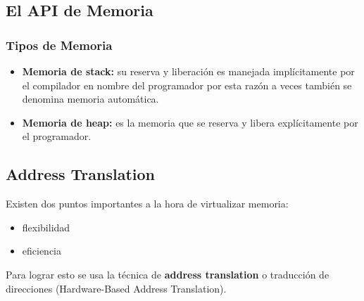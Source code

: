 \documentclass[../main.tex]{subfiles}
\begin{document}
    \subsection{El API de Memoria}
        \subsubsection{Tipos de Memoria}
            \begin{itemize}
                \item \textbf{Memoria de stack:} su reserva y liberación es manejada implícitamente por el compilador en nombre del programador por esta razón a veces también se denomina memoria automática.
                \item \textbf{Memoria de heap:} es la memoria que se reserva y libera explícitamente por el programador.
            \end{itemize}

    \subsection{Address Translation}
        Existen dos puntos importantes a la hora de virtualizar memoria:
        \begin{itemize}
            \item flexibilidad
            \item eficiencia
        \end{itemize}

        Para lograr esto se usa la técnica de \textbf{address translation} o traducción de direcciones (Hardware-Based Address Translation).\\
\end{document}
